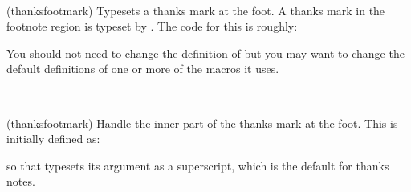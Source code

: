 \begin{syntax}
\cmd{\thanksfootmark} \\
\end{syntax}
\glossary(thanksfootmark)%
  {}%
  {Typesets a thanks mark at the foot.}
    A thanks mark in the footnote region is typeset by \cmd{\thanksfootmark}.
The code for this is roughly:
\begin{lcode}
\newcommand{\thanksfootmark}{%
  \hbox to\thanksmarkwidth{\hfil\normalfont%
     \thanksscript{\thefootnote}}}
\end{lcode}
You should not need to change the definition
of \cmd{\thanksfootmark} 
but you may want to change the default definitions of one or more
of the macros it uses.

\begin{syntax}
\cmd{\thanksscript} \\
\end{syntax}
\glossary(thanksfootmark)%
  {}%
  {Handle the inner part of the thanks mark at the foot.}
This is initially defined as: 
\begin{lcode}
\newcommand{\thanksscript}[1]{\textsuperscript{#1}}
\end{lcode}
so that \cmd{\thanksscript} typesets its argument as a superscript, which
is the default for thanks notes.




